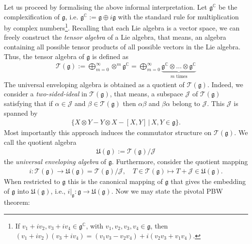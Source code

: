 \documentclass[12pt,oneside,a4paper]{book}
\numberwithin{equation}{section}     %
\theoremstyle{plain}
\theoremstyle{definition}
\begin{document}
Let us proceed by formalising the above informal interpretation. Let $\mathfrak{g}^{\mathbb{C}}$ be the complexification of $\mathfrak{g}$, i.e. $\mathfrak{g}^{\mathbb{C}}:=\mathfrak{g}\oplus i \mathfrak{g}$ with the standard rule for multiplication by complex numbers\footnote{If $v_1+iv_2,v_3+iv_4\in \mathfrak{g}^{\mathbb{C}}$, with $v_1,v_2,v_3,v_4\in\mathfrak{g}$, then $(v_1+iv_2)(v_3+iv_4)=(v_1v_3-v_2v_4)+i(v_2v_3+v_1v_4)$.}. Recalling that each Lie algebra is a vector space, we can freely construct the \textit{tensor algebra} of a Lie algebra, that means, an algebra containing all possible tensor products of all possible vectors in the Lie algebra. Thus, the tensor algebra of $\mathfrak{g}$ is defined as 
\begin{align*}
\mathcal{T}(\mathfrak{g}):=\bigoplus_{m=0}^\infty\otimes^m\mathfrak{g}^{\mathbb{C}}=\bigoplus_{m=0}^\infty \underbrace{\mathfrak{g}^{\mathbb{C}}\otimes\dots\otimes\mathfrak{g}^{\mathbb{C}}}_\text{$m$ times}
\end{align*}
The universal enveloping algebra is obtained as a quotient of $\mathcal{T}(\mathfrak{g})$. Indeed, we consider a \textit{two-sided-ideal} in $\mathcal{T}(\mathfrak{g})$, that means, a subspace $\mathcal{J}$ of $\mathcal{T}(\mathfrak{g})$ satisfying that if $\alpha\in\mathcal{J}$ and $\beta\in\mathcal{T}(\mathfrak{g})$ then $\alpha\beta$ and $\beta\alpha$ belong to $\mathcal{J}$. This $\mathcal{J}$ is spanned by
\begin{align*}
\{X\otimes Y-Y\otimes X -[X,Y]\,|\,X,Y\in\mathfrak{g}\}.
\end{align*}
Most importantly this approach induces the commutator structure on $\mathcal{T}(\mathfrak{g})$. We call the quotient algebra
\begin{align*}
\mathfrak{U}(\mathfrak{g}):=\mathcal{T}(\mathfrak{g})/\mathcal{J}
\end{align*}
the \textit{universal enveloping algebra} of $\mathfrak{g}$. Furthermore, consider the quotient mapping
\begin{align*}
i:\mathcal{T}(\mathfrak{g})\rightarrow \mathfrak{U}(\mathfrak{g})=\mathcal{T}(\mathfrak{g})/\mathcal{J},\quad T\in\mathcal{T}(\mathfrak{g})\mapsto T+\mathcal{J}\in\mathfrak{U}(\mathfrak{g}).
\end{align*}
When restricted to $\mathfrak{g}$ this is the canonical mapping of $\mathfrak{g}$ that gives the embedding of $\mathfrak{g}$ into $\mathfrak{U}(\mathfrak{g})$, i.e., $i\big|_{\mathfrak{g}}:\mathfrak{g}\rightarrow \mathfrak{U}(\mathfrak{g})$. Now we may state the pivotal PBW theorem:
\end{document}
